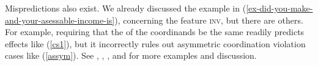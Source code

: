 

Mispredictions also exist. We already discussed the example in (\ref{ex-did-you-make-and-your-asessable-income-is}), concerning the feature \textsc{inv}, but there are others. For example, requiring that the \slashv of the coordinands be the same readily predicts  effects like 
(\ref{cs1}), but it incorrectly rules out asymmetric coordination violation cases like (\ref{assym}). 
See \citet{goldsmith}, \citet{lakoff86}, \citet{levinprince86}, and \citet{kehler} for more examples and discussion.


\eal
\label{cs1}


\zl




